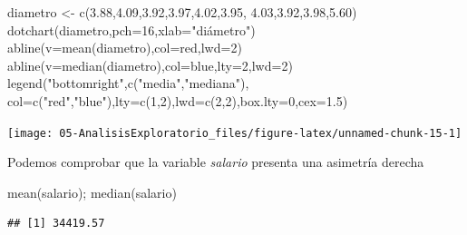 \documentclass[
]{book}
\newenvironment{Shaded}{\begin{snugshade}}{\end{snugshade}}
\newcommand{\AttributeTok}[1]{\textcolor[rgb]{0.77,0.63,0.00}{#1}}
\newcommand{\DecValTok}[1]{\textcolor[rgb]{0.00,0.00,0.81}{#1}}
\newcommand{\FloatTok}[1]{\textcolor[rgb]{0.00,0.00,0.81}{#1}}
\newcommand{\FunctionTok}[1]{\textcolor[rgb]{0.00,0.00,0.00}{#1}}
\newcommand{\NormalTok}[1]{#1}
\newcommand{\OtherTok}[1]{\textcolor[rgb]{0.56,0.35,0.01}{#1}}
\newcommand{\StringTok}[1]{\textcolor[rgb]{0.31,0.60,0.02}{#1}}
\theoremstyle{break}
\theoremstyle{nonumberplain}
\begin{document}
\begin{Shaded}
\begin{Highlighting}[]
\NormalTok{diametro }\OtherTok{\textless{}{-}} \FunctionTok{c}\NormalTok{(}\FloatTok{3.88}\NormalTok{,}\FloatTok{4.09}\NormalTok{,}\FloatTok{3.92}\NormalTok{,}\FloatTok{3.97}\NormalTok{,}\FloatTok{4.02}\NormalTok{,}\FloatTok{3.95}\NormalTok{, }\FloatTok{4.03}\NormalTok{,}\FloatTok{3.92}\NormalTok{,}\FloatTok{3.98}\NormalTok{,}\FloatTok{5.60}\NormalTok{)}
\FunctionTok{dotchart}\NormalTok{(diametro,}\AttributeTok{pch=}\DecValTok{16}\NormalTok{,}\AttributeTok{xlab=}\StringTok{"diámetro"}\NormalTok{)}
\FunctionTok{abline}\NormalTok{(}\AttributeTok{v=}\FunctionTok{mean}\NormalTok{(diametro),}\AttributeTok{col=}\StringTok{\textquotesingle{}red\textquotesingle{}}\NormalTok{,}\AttributeTok{lwd=}\DecValTok{2}\NormalTok{)}
\FunctionTok{abline}\NormalTok{(}\AttributeTok{v=}\FunctionTok{median}\NormalTok{(diametro),}\AttributeTok{col=}\StringTok{\textquotesingle{}blue\textquotesingle{}}\NormalTok{,}\AttributeTok{lty=}\DecValTok{2}\NormalTok{,}\AttributeTok{lwd=}\DecValTok{2}\NormalTok{)}
\FunctionTok{legend}\NormalTok{(}\StringTok{"bottomright"}\NormalTok{,}\FunctionTok{c}\NormalTok{(}\StringTok{"media"}\NormalTok{,}\StringTok{"mediana"}\NormalTok{),}
       \AttributeTok{col=}\FunctionTok{c}\NormalTok{(}\StringTok{"red"}\NormalTok{,}\StringTok{"blue"}\NormalTok{),}\AttributeTok{lty=}\FunctionTok{c}\NormalTok{(}\DecValTok{1}\NormalTok{,}\DecValTok{2}\NormalTok{),}\AttributeTok{lwd=}\FunctionTok{c}\NormalTok{(}\DecValTok{2}\NormalTok{,}\DecValTok{2}\NormalTok{),}\AttributeTok{box.lty=}\DecValTok{0}\NormalTok{,}\AttributeTok{cex=}\FloatTok{1.5}\NormalTok{)}
\end{Highlighting}
\end{Shaded}

\begin{center}\texttt{[image: 05-AnalisisExploratorio\_files/figure-latex/unnamed-chunk-15-1]} \end{center}

Podemos comprobar que la variable \emph{salario} presenta una
asimetría derecha

\begin{Shaded}
\begin{Highlighting}[]
\FunctionTok{mean}\NormalTok{(salario); }\FunctionTok{median}\NormalTok{(salario)}
\end{Highlighting}
\end{Shaded}

\begin{verbatim}
## [1] 34419.57
\end{verbatim}
\end{document}
